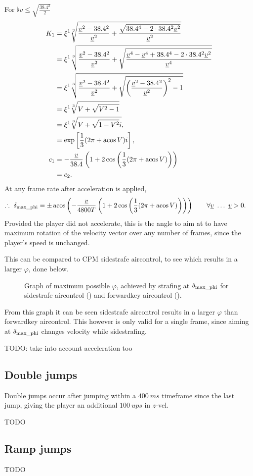 For $\flat{v} \le \sqrt{\frac{38.4^2}{2}}$
\begin{align*}
K_1 &= \xi^1 \sqrt[3]{\frac{\flat{v}^2 - 38.4^2}{\flat{v}^2} + \frac{\sqrt{38.4^4 - 2\cdot 38.4^2\flat{v}^2}}{\flat{v}^2}}\\
&= \xi^1 \sqrt[3]{\frac{\flat{v}^2 - 38.4^2}{\flat{v}^2} + \sqrt{\frac{\flat{v}^4 - \flat{v}^4 + 38.4^4 - 2\cdot 38.4^2\flat{v}^2}{\flat{v}^4}}}\\
&= \xi^1 \sqrt[3]{\frac{\flat{v}^2 - 38.4^2}{\flat{v}^2} + \sqrt{\left(\frac{\flat{v}^2 - 38.4^2}{\flat{v}^2} \right)^2 - 1}}\\
&= \xi^1 \sqrt[3]{V + \sqrt{V^2 - 1}}\\
&= \xi^1 \sqrt[3]{V + \sqrt{1 - V^2}i},\\
&= \exp\left[\frac{1}{3} (2\pi + \acos V) i \right],\\
c_1 &= -\frac{\flat{v}}{38.4} \left(1 + 2\cos\left(\frac{1}{3} (2\pi + \acos V) \right) \right)\\
&= c_2.
\end{align*}
At any frame rate after acceleration is applied,
\begin{align}
\label{eq:W_turning_maxphi_trig_sol}
\therefore\ \delta_{\maxphi} &= \pm \acos\left(-\frac{\flat{v}}{4800T} \left(1 + 2\cos\left(\frac{1}{3} (2\pi + \acos V) \right) \right) \right)\qquad \forall \flat{v}\ \ldots\ \flat{v} > 0.
\end{align}
Provided the player did not accelerate, this is the angle to aim at to have maximum rotation of the velocity vector over any number of frames, since the player's speed is unchanged.

This can be compared to CPM sidestrafe aircontrol, to see which results in a larger $\varphi$, done below.
\begin{figure}[H]
	\centering
	\setlength\figureheight{4.8cm}
	\setlength\figurewidth{13cm}
	\caption{Graph of maximum possible $\varphi$, achieved by strafing at $\delta_{\operatorname{max\_phi}}$ for sidestrafe aircontrol (\bluearrow) and forwardkey aircontrol (\greenarrow).}
	\label{fig:air_control_phi}
\end{figure}
From this graph it can be seen sidestrafe aircontrol results in a larger $\varphi$ than forwardkey aircontrol. This however is only valid for a single frame, since aiming at $\delta_{\operatorname{max\_phi}}$ changes velocity while sidestrafing.

TODO: take into account acceleration too


\subsection{Double jumps}
\label{sec:dj}
Double jumps occur after jumping within a $\qty{400}{ms}$ timeframe since the last jump, giving the player an additional $\qty{100}{ups}$ in $z$-vel.

TODO


\subsection{Ramp jumps}
\label{sec:ramp_jumps}
TODO
